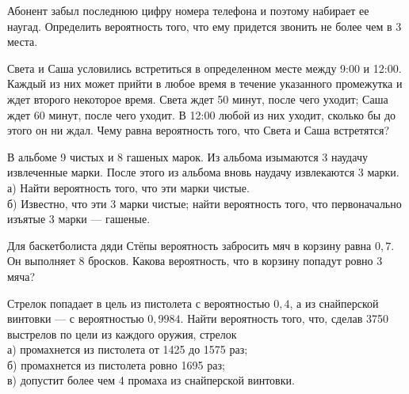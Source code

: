 \newpage\setcounter{zad}{0}



\begin{zkrW}{20}\noindent 
	Абонент забыл последнюю цифру номера телефона и поэтому набирает ее наугад. Определить вероятность того, что ему придется звонить не более чем в 3 места.
 
\end{zkrW}

\begin{zkrW}{20}\noindent 
	Света и Саша условились встретиться в определенном месте между 9:00 и 12:00. Каждый из них может прийти в любое время в течение указанного промежутка и ждет второго некоторое время. Света ждет 50 минут, после чего уходит; Саша ждет 60 минут, после чего уходит. В 12:00 любой из них уходит, сколько бы до этого он ни ждал. Чему равна вероятность того, что Света и Саша встретятся?
 
\end{zkrW}

\begin{zkrW}{20}\noindent 
	В альбоме 9 чистых и 8 гашеных марок. Из альбома изымаются 3 наудачу извлеченные марки. После этого из альбома вновь наудачу извлекаются 3 марки. \\ \indent а) Найти вероятность того, что эти марки чистые. \\ \indent б) Известно, что эти 3 марки чистые; найти вероятность того, что первоначально изъятые 3 марки --- гашеные.
 
\end{zkrW}

\begin{zkrW}{20}\noindent 
	Для баскетболиста дяди Стёпы вероятность забросить мяч в корзину равна $0{,}7$. Он выполняет 8 бросков. Какова вероятность, что в корзину попадут ровно 3 мяча?
 
\end{zkrW}

\begin{zkrW}{20}\noindent 
	Стрелок попадает в цель из пистолета с вероятностью $0{,}4$, а из снайперской винтовки --- с вероятностью $0{,}9984$. Найти вероятность того, что, сделав 3750 выстрелов по цели из каждого оружия, стрелок \\ \indent а) промахнется из пистолета от 1425 до 1575 раз; \\ \indent б) промахнется из пистолета ровно 1695 раз; \\ \indent в) допустит более чем 4 промаха из снайперской винтовки.
 
\end{zkrW}

